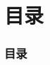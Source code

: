 
\begin{frame}
  \titlepage

\end{frame}

\section*{目录}
\label{sec:toc}

\begin{comment}
\end{comment}

\begin{frame}
  \frametitle{\textbf{目录}}
  \textbf{\tableofcontents}
\end{frame}
